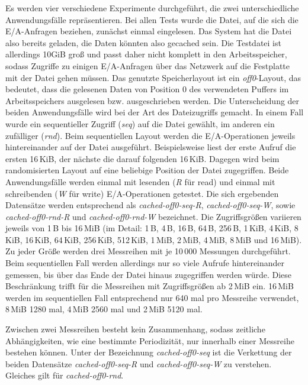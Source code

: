 \documentclass[
	12pt,
	a4paper,
	BCOR10mm,
	DIV14,
	listof=totoc,
	bibliography=totoc,
	headsepline
]{scrreprt}
\begin{document}
Es werden vier verschiedene Experimente durchgeführt, die zwei unterschiedliche Anwendungsfälle repräsentieren.
Bei allen Tests wurde die Datei, auf die sich die E/A-Anfragen beziehen, zunächst einmal eingelesen. Das System hat die Datei also bereits geladen, die Daten könnten also gecached sein.
Die Testdatei ist allerdings 10GiB groß und passt daher nicht komplett in den Arbeitsspeicher, sodass Zugriffe zu einigen E/A-Anfragen über das Netzwerk auf die Festplatte mit der Datei gehen müssen.
Das genutzte Speicherlayout ist ein \textit{off0}-Layout, das bedeutet, dass die gelesenen Daten von Position 0 des verwendeten Puffers im Arbeitsspeichers ausgelesen bzw. ausgeschrieben werden.
Die Unterscheidung der beiden Anwendungsfälle wird bei der Art des Dateizugriffs gemacht.
In einem Fall wurde ein sequentieller Zugriff (\textit{seq}) auf die Datei gewählt, im anderen ein zufälliger (\textit{rnd}).
Beim sequentiellen Layout werden die E/A-Operationen jeweils hintereinander auf der Datei ausgeführt. Beispielsweise liest der erste Aufruf die ersten 16\,KiB, der nächste die darauf folgenden 16\,KiB.
Dagegen wird beim randomisierten Layout auf eine beliebige Position der Datei zugegriffen.
Beide Anwendungsfälle werden einmal mit lesenden (\textit{R} für read) und einmal mit schreibenden (\textit{W} für write) E/A-Operationen getestet.
Die sich ergebenden Datensätze werden entsprechend als \textit{cached-off0-seq-R}, \textit{cached-off0-seq-W}, sowie \textit{cached-off0-rnd-R} und \textit{cached-off0-rnd-W} bezeichnet.
Die Zugriffsgrößen variieren jeweils von 1\,B bis 16\,MiB (im Detail: 1\,B, 4\,B, 16\,B, 64\,B, 256\,B, 1\,KiB, 4\,KiB, 8\,KiB, 16\,KiB, 64\,KiB, 256\,KiB, 512\,KiB, 1\,MiB, 2\,MiB, 4\,MiB, 8\,MiB und 16\,MiB).
Zu jeder Größe werden drei Messreihen mit je 10\,000 Messungen durchgeführt.
Beim sequentiellen Fall werden allerdings nur so viele Aufrufe hintereinander gemessen, bis über das Ende der Datei hinaus zugegriffen werden würde.
Diese Beschränkung trifft für die Messreihen mit Zugriffsgrößen ab 2\,MiB ein. 16\,MiB werden im sequentiellen Fall entsprechend nur 640 mal pro Messreihe verwendet, 8\,MiB 1280 mal, 4\,MiB 2560 mal und 2\,MiB 5120 mal.\medskip

Zwischen zwei Messreihen besteht kein Zusammenhang, sodass zeitliche Abhängigkeiten, wie eine bestimmte Periodizität, nur innerhalb einer Messreihe bestehen können.  
Unter der Bezeichnung \textit{cached-off0-seq} ist die Verkettung der beiden Datensätze \textit{cached-off0-seq-R} und \textit{cached-off0-seq-W} zu verstehen. Gleiches gilt für \textit{cached-off0-rnd}.\medskip
\end{document}
